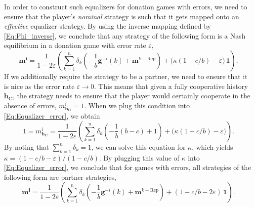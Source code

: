\documentclass[9pt,twoside,lineno]{pnas-new}
\theoremstyle{plainCl1}
\theoremstyle{plainCl2}
\begin{document}
In order to construct such equalizers for donation games with errors, we need to ensure that the player's {\it nominal} strategy is such that it gets mapped onto an {\it effective} equalizer strategy. 
By using the inverse mapping defined by \eqref{Eq:Phi_inverse}, we conclude that any strategy of the following form is a Nash equilibrium in a donation game with error rate $\varepsilon$, 
\begin{equation} \label{Eq:Equalizer_error}
\mathbf{m^{i}} =\frac{1}{1-2\varepsilon}\left( \sum_{k=1}^n \delta_k \left(-\frac{1}{b}\mathbf{g}^{-i}(k) +\mathbf{m}^{k-\text{Rep}}\right) + \big(\kappa(1\!-\!c/b)-\varepsilon\big)\, \mathbf{1}\right).
\end{equation}
If we additionally require the strategy to be a partner, we need to ensure that it is nice as the error rate $\varepsilon\to 0$. 
This means that given a fully cooperative history $\mathbf{h_\mathbf{C}}$, the strategy needs to ensure that the player would certainly cooperate in the absence of errors, $m^i_\mathbf{h_C}\!=\!1$. When we plug this condition into \eqref{Eq:Equalizer_error}, we obtain
\begin{equation}
1 = m^{i}_{\mathbf{h_C}} =\frac{1}{1-2\varepsilon}\left( \sum_{k=1}^n \delta_k \left(-\frac{1}{b}(b\!-\!c) +1\right) + \big(\kappa(1\!-\!c/b)-\varepsilon\big)\right).
\end{equation}
By noting that $\sum_{k=1}^n \delta_k\!=\!1$, we can solve this equation for $\kappa$, which yields $\kappa\!=\!(1\!-\!c/b\!-\!\varepsilon)/(1\!-\!c/b)$. 
By plugging this value of $\kappa$ into \eqref{Eq:Equalizer_error}, we conclude that for games with errors, all strategies of the following form are partner strategies,
\begin{equation} \label{Eq:Partner_error}
\mathbf{m^{i}} =\frac{1}{1-2\varepsilon}\left( \sum_{k=1}^n \delta_k \left(-\frac{1}{b}\mathbf{g}^{-i}(k) +\mathbf{m}^{k-\text{Rep}}\right) + (1\!-\!c/b\!-\!2\varepsilon)\, \mathbf{1}\right).
\end{equation}

~
\end{document}

